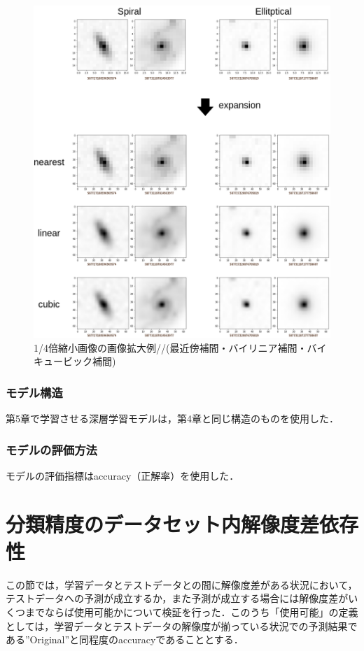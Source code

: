 \documentclass[a4j, 11pt]{jreport}
\begin{document}
\begin{figure}[H]
 \centering
 \includegraphics[width=13cm]{images/5syou/syuron_5syou_kakudai/ver1/5syou_kakudai_ver1.png}
 \caption{1/4倍縮小画像の画像拡大例//(最近傍補間・バイリニア補間・バイキュービック補間)}
 \label{fig:kakudai_1_4}
\end{figure}

\subsubsection{モデル構造}
第5章で学習させる深層学習モデルは，第4章と同じ構造のものを使用した．
 
\subsubsection{モデルの評価方法}
モデルの評価指標はaccuracy（正解率）を使用した．


\section{分類精度のデータセット内解像度差依存性}
この節では，学習データとテストデータとの間に解像度差がある状況において，テストデータへの予測が成立するか，また予測が成立する場合には解像度差がいくつまでならば使用可能かについて検証を行った．このうち「使用可能」の定義としては，学習データとテストデータの解像度が揃っている状況での予測結果である''Original''と同程度のaccuracyであることとする．
\end{document}
